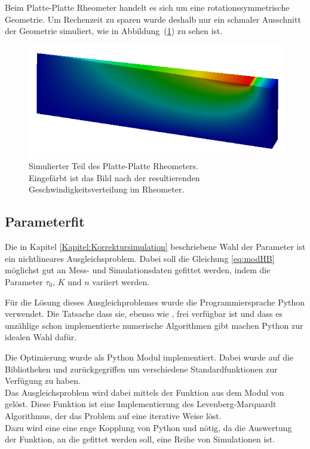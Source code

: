 Beim Platte-Platte Rheometer handelt es sich um eine rotationssymmetrische Geometrie. Um Rechenzeit zu sparen wurde deshalb nur ein schmaler Ausschnitt der Geometrie simuliert, wie in Abbildung~(\ref{fig:plattePlatteRheo})  zu sehen ist.\\
\begin{figure}
\centering
\includegraphics[width=.6\textwidth]{figures/plattenRheometerSchnitz.png}
\caption{Simulierter Teil des Platte-Platte Rheometers.\\
Eingefärbt ist das Bild nach der resultierenden Geschwindigkeitsverteilung im Rheometer.}
\label{fig:plattePlatteRheo}
\end{figure}
%
\subsection{Parameterfit}
Die in Kapitel \ref{Kapitel:Korrektursimulation} beschriebene Wahl der Parameter ist ein nichtlineares Ausgleichsproblem. Dabei soll die Gleichung \eqref{eq:modHB} möglichst gut an Mess- und Simulationsdaten gefittet werden, indem die Parameter $\tau_0$, $K$ und $n$ variiert werden.

Für die Lösung dieses Ausgleichproblemes wurde die Programmiersprache Python verwendet. Die Tatsache dass sie, ebenso wie \openfoam{}, frei verfügbar ist und dass es unzählige schon implementierte numerische Algorithmen gibt machen Python zur idealen Wahl dafür.

Die Optimierung wurde als Python Modul  implementiert. Dabei wurde auf die Bibliotheken  und  \cite{scipy} zurückgegriffen um verschiedene Standardfunktionen zur Verfügung zu haben.\\
Das Ausgleichsproblem wird dabei mittels der Funktion  aus dem Modul  von  gelöst.
Diese Funktion ist eine Implementierung des Levenberg-Marquardt Algorithmus, der das Problem auf eine iterative Weise löst.\\
Dazu wird eine eine enge Kopplung von Python und \openfoam{} nötig, da die Auswertung der Funktion, an die gefittet werden soll, eine Reihe von Simulationen ist.

